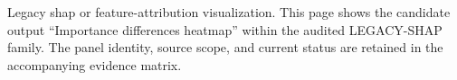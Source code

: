 Legacy shap or feature-attribution visualization. This page shows the candidate output ``Importance differences heatmap'' within the audited LEGACY-SHAP family. The panel identity, source scope, and current status are retained in the accompanying evidence matrix.
